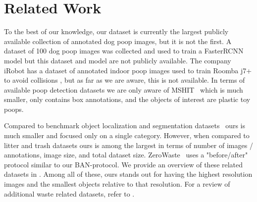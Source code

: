 \documentclass[10pt,twocolumn,letterpaper]{article}
\begin{document}


\section{Related Work}
\label{sec:relatedwork}

To the best of our knowledge, our dataset is currently the largest publicly available collection of
  annotated dog poop images, but it is not the first.
A dataset of 100 dog poop images was collected and used to train a FasterRCNN model
  \cite{neeraj_madan_dog_2019} but this dataset and model are not publicly available.
The company iRobot has a dataset of annotated indoor poop images used to train Roomba j7+ to avoid
  collisions \cite{roomba_2021}, but as far as we are aware, this is not available.
In terms of available poop detection datasets we are only aware of MSHIT~\cite{mshit_2020} which is much
  smaller, only contains box annotations, and the objects of interest are plastic toy poops.

Compared to benchmark object localization and segmentation datasets~\cite{ILSVRC15,
  lin_microsoft_2014,cordts2015cityscapes} ours is much smaller and focused only on a single category.
However, when compared to litter and trash datasets
  \cite{bashkirova_zerowaste_2022,proenca_taco_2020,hong2020trashcansemanticallysegmenteddatasetvisual,mittal2016spotgarbage,rs13050965}
  ours is among the largest in terms of number of images / annotations, image size, and total dataset size.
ZeroWaste~\cite{bashkirova_zerowaste_2022} uses a "before/after" protocol similar to our BAN-protocol.
We provide an overview of these related datasets in .
Among all of these, ours stands out for having the highest resolution images and the smallest objects
  relative to that resolution.
For a review of additional waste related datasets, refer to \cite{agnieszka_waste}.

\end{document}

